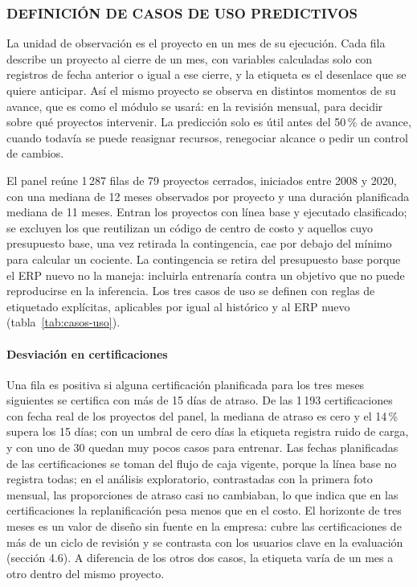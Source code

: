 \subsubsection{DEFINICIÓN DE CASOS DE USO PREDICTIVOS}

La unidad de observación es el proyecto en un mes de su ejecución. Cada fila describe un proyecto al cierre de un mes, con variables calculadas solo con registros de fecha anterior o igual a ese cierre, y la etiqueta es el desenlace que se quiere anticipar. Así el mismo proyecto se observa en distintos momentos de su avance, que es como el módulo se usará: en la revisión mensual, para decidir sobre qué proyectos intervenir. La predicción solo es útil antes del 50\,\% de avance, cuando todavía se puede reasignar recursos, renegociar alcance o pedir un control de cambios.

El panel reúne 1\,287 filas de 79 proyectos cerrados, iniciados entre 2008 y 2020, con una mediana de 12 meses observados por proyecto y una duración planificada mediana de 11 meses. Entran los proyectos con línea base y ejecutado clasificado; se excluyen los que reutilizan un código de centro de costo y aquellos cuyo presupuesto base, una vez retirada la contingencia, cae por debajo del mínimo para calcular un cociente. La contingencia se retira del presupuesto base porque el ERP nuevo no la maneja: incluirla entrenaría contra un objetivo que no puede reproducirse en la inferencia. Los tres casos de uso se definen con reglas de etiquetado explícitas, aplicables por igual al histórico y al ERP nuevo (tabla~\ref{tab:casos-uso}).

\paragraph{Desviación en certificaciones}

Una fila es positiva si alguna certificación planificada para los tres meses siguientes se certifica con más de 15 días de atraso. De las 1\,193 certificaciones con fecha real de los proyectos del panel, la mediana de atraso es cero y el 14\,\% supera los 15 días; con un umbral de cero días la etiqueta registra ruido de carga, y con uno de 30 quedan muy pocos casos para entrenar. Las fechas planificadas de las certificaciones se toman del flujo de caja vigente, porque la línea base no registra todas; en el análisis exploratorio, contrastadas con la primera foto mensual, las proporciones de atraso casi no cambiaban, lo que indica que en las certificaciones la replanificación pesa menos que en el costo. El horizonte de tres meses es un valor de diseño sin fuente en la empresa: cubre las certificaciones de más de un ciclo de revisión y se contrasta con los usuarios clave en la evaluación (sección 4.6). A diferencia de los otros dos casos, la etiqueta varía de un mes a otro dentro del mismo proyecto.

